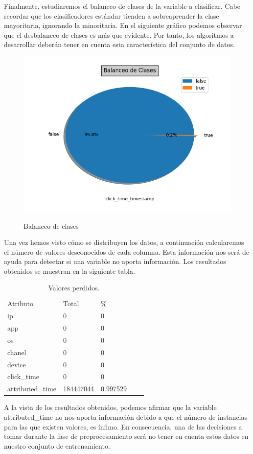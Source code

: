 Finalmente, estudiaremos el balanceo de clases de la variable a clasificar. Cabe recordar que los clasificadores estándar tienden a sobreaprender la clase mayoritaria, ignorando la minoritaria. En el siguiente gráfico podemos observar que el desbalanceo de clases es más que evidente. Por tanto, los algoritmos a desarrollar deberán tener en cuenta esta característica del conjunto de datos.
\begin{figure}[H]
\includegraphics[scale=0.65]{img/imbalacing.png}
\label{}
\caption{Balanceo de clases}
\end{figure}

Una vez hemos visto cómo se distribuyen los datos, a continuación calcularemos el número de valores desconocidos de cada columna. Esta información nos será de ayuda para detectar si una variable no aporta información. Los resultados obtenidos se muestran en la siguiente tabla.
\begin{table}[H]
	\centering
	\begin{tabular}{lllll}
	Atributo& Total & \%    \\
	ip	& 0 &0 \\
	app	& 0 & 0   \\
	os	& 0 & 0 \\
	chanel &0 & 0 \\
	device & 0 & 0  \\
	click\_time& 0& 0 \\
	attributed\_time &184447044& 0.997529
	\end{tabular}
	\caption{Valores perdidos.}
\label{}
\end{table}
A la vista de los resultados obtenidos, podemos afirmar que la variable attributed\_time no nos aporta información debido a que el número de instancias para las que existen valores, es ínfimo. En consecuencia, una de las decisiones a tomar durante la fase de preprocesamiento será no tener en cuenta estos datos en nuestro conjunto de entrenamiento.
\medskip

